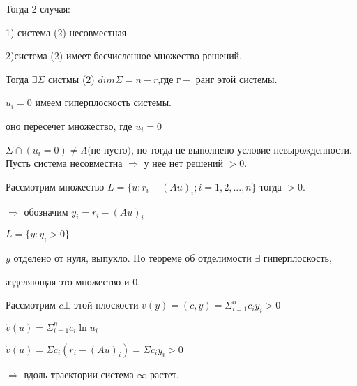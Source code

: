 Тогда 2 случая:

\begin{center}
1) система (2) несовместная

2)система (2) имеет бесчисленное множество решений.
\end{center}

Тогда $\exists \Sigma$ систмы (2) $ dim \Sigma = n - r $,где  $г - $ ранг этой системы.

\vspace{0.5cm}
$u_i = 0$ имеем гиперплоскость системы.

оно пересечет множество, где $u_i = 0$

$
\Sigma\cap(u_i = 0) \neq\Lambda \textit{(не пусто)}
$, но тогда не выполнено условие невырожденности.
Пусть система несовместна $\Rightarrow$ у нее нет решений $>0$.

Рассмотрим множество $L = \lbrace u : r_i - (Au)_i; i = 1,2,...,n\rbrace$
тогда $>0$.

$\Longrightarrow$ обозначим $y_i = r_i - (Au)_i$

$L = \lbrace y : y_i>0\rbrace$

$y $ отделено от нуля, выпукло. По теореме об отделимости $ \exists $ гиперплоскость, 

азделяющая это множество и 0.

\begin{figure} [h!]
			\caption{}	
\end{figure}

\vspace{0.5cm}
Рассмотрим $ c \bot $ этой плоскости $v(y) = (c,y) = \Sigma_{i=1}^n c_i y_i > 0$

$ \dot{v}(u) = \Sigma_{i=1}^n c_i \ln u_i $

$ \dot{v}(u) = \Sigma c_i(r_i - (Au)_i) = \Sigma c_i y_i > 0 $

$\Rightarrow$ вдоль траектории система $\infty$ растет.






























